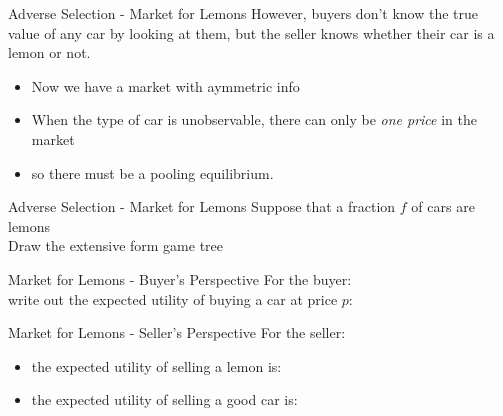
\begin{frame}{Adverse Selection - Market for Lemons}
  However, buyers don't know the true value of any car by looking at them,
  but the seller knows whether their car is a lemon or not.
  \begin{itemize}
    \item Now we have a market with \alert{aymmetric info}
    \item When the type of car is unobservable,
    there can only be \textit{one price} in the market
    \item so there must be a pooling equilibrium.
  \end{itemize}
\end{frame}


\begin{frame}{Adverse Selection - Market for Lemons}
   Suppose that a fraction $f$  of cars are lemons \\ 
   Draw the extensive form game tree
\end{frame}


\begin{frame}[plain]{}
  
\end{frame}


\begin{frame}{Market for Lemons - Buyer's Perspective}
  For the buyer: \\ 
  write out the expected utility of buying a car at price $p$:
\end{frame}


\begin{frame}{Market for Lemons - Seller's Perspective}
  For the seller: \\ 
  \begin{itemize}
    \item the expected utility of selling a lemon is:
    \vspace{15mm}
    \item the expected utility of selling a good car is:
  \end{itemize}
\end{frame}

